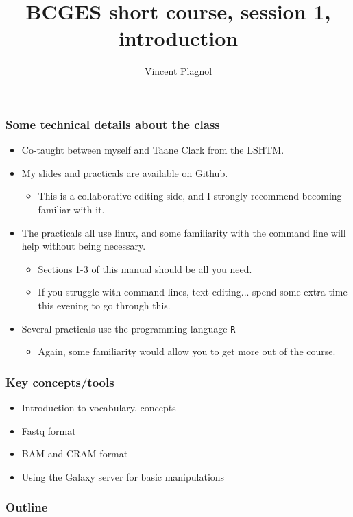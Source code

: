 \documentclass{beamer}
\title[]{BCGES short course, session 1, introduction}
\author[]{Vincent Plagnol}
\date{}
\institute{UCL Genetics Institute}
\begin{document}
\begin{frame}
  \titlepage
\end{frame}


\begin{frame}
  \frametitle{Some technical details about the class}
  \begin{itemize}
  \item Co-taught between myself and Taane Clark from the LSHTM.
  \item My slides and practicals are available on \href{https://github.com/vplagnol/BCGES_short_courses}{Github}.
    \begin{itemize}
    \item This is a collaborative editing side, and I strongly recommend becoming familiar with it.
    \end{itemize}
  \item The practicals all use linux, and some familiarity with the command line will help without being necessary.
    \begin{itemize}
      \item Sections 1-3 of this \href{http://linuxcommand.org/learning_the_shell.php}{manual} should be all you need.
      \item If you struggle with command lines, text editing... spend some extra time this evening to go through this.
    \end{itemize}
  \item Several practicals use the programming language \texttt{R}
    \begin{itemize}
    \item Again, some familiarity would allow you to get more out of the course.
    \end{itemize}
  \end{itemize}
\end{frame}


\begin{frame}
  \frametitle{Key concepts/tools}
  \begin{itemize}
  \item Introduction to vocabulary, concepts
  \item Fastq format
  \item BAM and CRAM format
  \item Using the Galaxy server for basic manipulations
  \end{itemize}
\end{frame}

\begin{frame}
  \frametitle{Outline}
  \tableofcontents
\end{frame}
\end{document}
